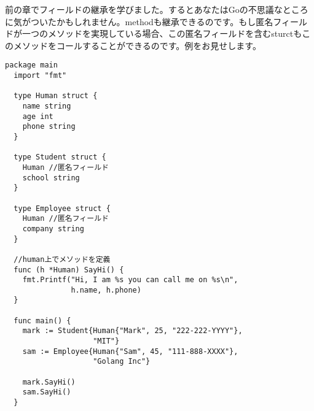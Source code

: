 前の章でフィールドの継承を学びました。するとあなたはGoの不思議なところに気がついたかもしれません。methodも継承できるのです。もし匿名フィールドが一つのメソッドを実現している場合、この匿名フィールドを含むsturctもこのメソッドをコールすることができるのです。例をお見せします。


\begin{lstlisting}[numbers=none]
  package main
  import "fmt"

  type Human struct {
    name string
    age int
    phone string
  }

  type Student struct {
    Human //匿名フィールド
    school string
  }

  type Employee struct {
    Human //匿名フィールド
    company string
  }

  //human上でメソッドを定義
  func (h *Human) SayHi() {
    fmt.Printf("Hi, I am %s you can call me on %s\n",
               h.name, h.phone)
  }

  func main() {
    mark := Student{Human{"Mark", 25, "222-222-YYYY"},
                    "MIT"}
    sam := Employee{Human{"Sam", 45, "111-888-XXXX"},
                    "Golang Inc"}

    mark.SayHi()
    sam.SayHi()
  }
\end{lstlisting}
